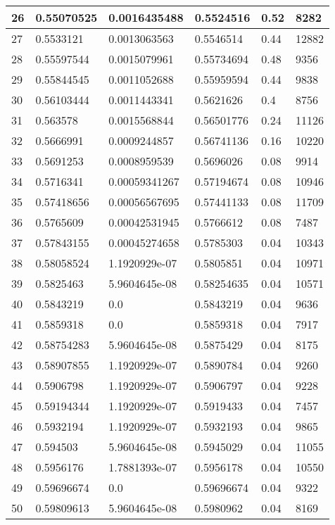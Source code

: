 \begin{longtable}{|l|l|l|l|l|l|}
26 & 0.55070525 & 0.0016435488 & 0.5524516 & 0.52 & 8282 \\ \hline 
27 & 0.5533121 & 0.0013063563 & 0.5546514 & 0.44 & 12882 \\ \hline 
28 & 0.55597544 & 0.0015079961 & 0.55734694 & 0.48 & 9356 \\ \hline 
29 & 0.55844545 & 0.0011052688 & 0.55959594 & 0.44 & 9838 \\ \hline 
30 & 0.56103444 & 0.0011443341 & 0.5621626 & 0.4 & 8756 \\ \hline 
31 & 0.563578 & 0.0015568844 & 0.56501776 & 0.24 & 11126 \\ \hline 
32 & 0.5666991 & 0.0009244857 & 0.56741136 & 0.16 & 10220 \\ \hline 
33 & 0.5691253 & 0.0008959539 & 0.5696026 & 0.08 & 9914 \\ \hline 
34 & 0.5716341 & 0.00059341267 & 0.57194674 & 0.08 & 10946 \\ \hline 
35 & 0.57418656 & 0.00056567695 & 0.57441133 & 0.08 & 11709 \\ \hline 
36 & 0.5765609 & 0.00042531945 & 0.5766612 & 0.08 & 7487 \\ \hline 
37 & 0.57843155 & 0.00045274658 & 0.5785303 & 0.04 & 10343 \\ \hline 
38 & 0.58058524 & 1.1920929e-07 & 0.5805851 & 0.04 & 10971 \\ \hline 
39 & 0.5825463 & 5.9604645e-08 & 0.58254635 & 0.04 & 10571 \\ \hline 
40 & 0.5843219 & 0.0 & 0.5843219 & 0.04 & 9636 \\ \hline 
41 & 0.5859318 & 0.0 & 0.5859318 & 0.04 & 7917 \\ \hline 
42 & 0.58754283 & 5.9604645e-08 & 0.5875429 & 0.04 & 8175 \\ \hline 
43 & 0.58907855 & 1.1920929e-07 & 0.5890784 & 0.04 & 9260 \\ \hline 
44 & 0.5906798 & 1.1920929e-07 & 0.5906797 & 0.04 & 9228 \\ \hline 
45 & 0.59194344 & 1.1920929e-07 & 0.5919433 & 0.04 & 7457 \\ \hline 
46 & 0.5932194 & 1.1920929e-07 & 0.5932193 & 0.04 & 9865 \\ \hline 
47 & 0.594503 & 5.9604645e-08 & 0.5945029 & 0.04 & 11055 \\ \hline 
48 & 0.5956176 & 1.7881393e-07 & 0.5956178 & 0.04 & 10550 \\ \hline 
49 & 0.59696674 & 0.0 & 0.59696674 & 0.04 & 9322 \\ \hline 
50 & 0.59809613 & 5.9604645e-08 & 0.5980962 & 0.04 & 8169 \\ \hline 

\end{longtable}

